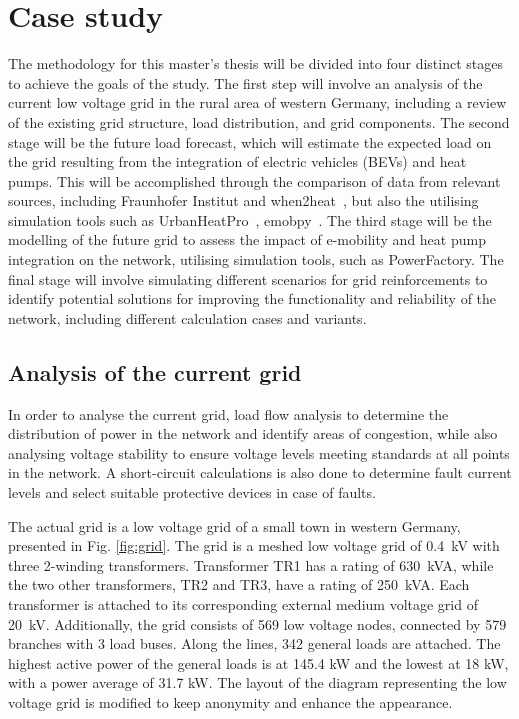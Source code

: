 \chapter{Case study}

The methodology for this master's thesis will be divided into four distinct stages to achieve the goals of the study. The first step will involve an analysis of the current low voltage grid in the rural area of western Germany, including a review of the existing grid structure, load distribution, and grid components. The second stage will be the future load forecast, which will estimate the expected load on the grid resulting from the integration of electric vehicles (BEVs) and heat pumps. This will be accomplished through the comparison of data from relevant sources, including Fraunhofer Institut and when2heat~\cite{when2heat}, but also the utilising simulation tools such as UrbanHeatPro~\cite{urbanheatpro}, emobpy~\cite{emobpy}.  The third stage will be the modelling of the future grid to assess the impact of e-mobility and heat pump integration on the network, utilising simulation tools, such as PowerFactory. The final stage will involve simulating different scenarios for grid reinforcements to identify potential solutions for improving the functionality and reliability of the network, including different calculation cases and variants. 

\section{Analysis of the current grid}

In order to analyse the current grid, load flow analysis to determine the distribution of power in the network and identify areas of congestion, while also analysing voltage stability to ensure voltage levels meeting standards at all points in the network. A short-circuit calculations is also done to determine fault current levels and select suitable protective devices in case of faults.

The actual grid is a low voltage grid of a small town in western Germany, presented in Fig. \ref{fig:grid}. The grid is a meshed low voltage grid of 0.4~kV with three 2-winding transformers. Transformer TR1 has a rating of 630~kVA, while the two other transformers, TR2 and TR3, have a rating of 250~kVA. Each transformer is attached to its corresponding external medium voltage grid of 20~kV. Additionally, the grid consists of 569 low voltage nodes, connected by 579 branches with 3 load buses. Along the lines, 342 general loads are attached. The highest active power of the general loads is at 145.4 kW and the lowest at 18 kW, with a power average of 31.7 kW. The layout of the diagram representing the low voltage grid is modified to keep anonymity and enhance the appearance. 

